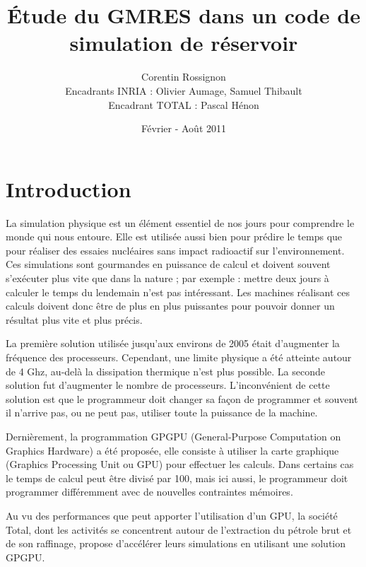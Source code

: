 \documentclass[a4paper,11pt]{report}
\begin{document}
\title{Étude du GMRES dans un code de simulation de réservoir}
\author{Corentin Rossignon\\
  Encadrants INRIA : Olivier Aumage, Samuel Thibault\\
  Encadrant TOTAL : Pascal Hénon}
\date{Février - Août 2011}
\maketitle

\tableofcontents

\chapter*{Introduction}
 La simulation physique est un élément essentiel de nos jours pour
 comprendre le monde qui nous entoure. Elle est utilisée aussi bien
 pour prédire le temps que pour réaliser des essaies nucléaires sans
 impact radioactif sur l'environnement. Ces simulations sont gourmandes en
 puissance de calcul et doivent souvent s'exécuter plus vite que dans
 la nature ; par exemple : mettre deux jours à calculer le temps du
 lendemain n'est pas intéressant. Les machines réalisant ces calculs
 doivent donc être de plus en plus puissantes pour pouvoir donner un
 résultat plus vite et plus précis.

 La première solution utilisée jusqu'aux environs de 
 2005 était d'augmenter la fréquence des processeurs. Cependant, une limite physique
 a été atteinte autour de 4 Ghz, au-delà la dissipation thermique
 n'est plus possible. La
 seconde solution fut d'augmenter le nombre de processeurs.
 L'inconvénient de cette solution est que le programmeur doit changer
 sa façon de programmer et souvent il n'arrive pas, ou ne peut pas, utiliser toute
 la puissance de la machine.

 Dernièrement, la programmation
 GPGPU (General-Purpose Computation on Graphics Hardware) a été proposée,
 elle consiste à utiliser la carte graphique (Graphics Processing Unit
 ou GPU) pour effectuer les
 calculs. Dans certains cas le temps de calcul peut être
 divisé par 100, mais ici aussi, le programmeur doit programmer
 différemment avec de nouvelles contraintes mémoires. 

 Au vu des performances que peut apporter l'utilisation d'un GPU, la
 société Total, dont les activités se concentrent autour de
 l'extraction du pétrole brut et de son raffinage, propose d'accélérer
 leurs simulations en utilisant une solution GPGPU.
\end{document}
